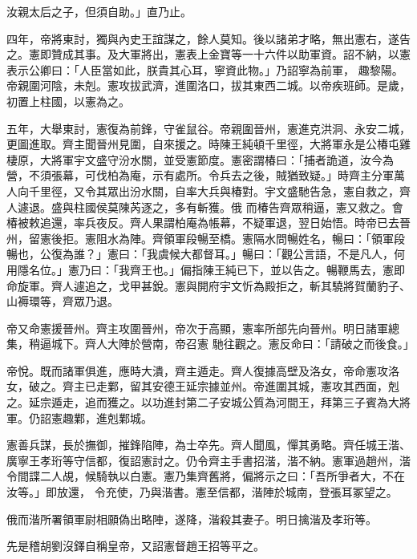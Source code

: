 \begin{pinyinscope}
 汝親太后之子，但須自助。」直乃止。



 四年，帝將東討，獨與內史王誼謀之，餘人莫知。後以諸弟才略，無出憲右，遂告之。憲即贊成其事。及大軍將出，憲表上金寶等一十六件以助軍資。詔不納，以憲表示公卿曰：「人臣當如此，朕貴其心耳，寧資此物。」乃詔寧為前軍，
 趣黎陽。帝親圍河陰，未剋。憲攻拔武濟，進圍洛口，拔其東西二城。以帝疾班師。是歲，初置上柱國，以憲為之。



 五年，大舉東討，憲復為前鋒，守雀鼠谷。帝親圍晉州，憲進克洪洞、永安二城，更圖進取。齊主聞晉州見圍，自來援之。時陳王純頓千里徑，大將軍永是公椿屯雞棲原，大將軍宇文盛守汾水關，並受憲節度。憲密謂椿曰：「捕者詭道，汝今為營，不須張幕，可伐柏為庵，示有處所。令兵去之後，賊猶致疑。」時齊主分軍萬人向千里徑，又令其眾出汾水關，自率大兵與椿對。宇文盛馳告急，憲自救之，齊人遽退。盛與柱國侯莫陳芮逐之，多有斬獲。俄
 而椿告齊眾稍逼，憲又救之。會椿被敕追還，率兵夜反。齊人果謂柏庵為帳幕，不疑軍退，翌日始悟。時帝已去晉州，留憲後拒。憲阻水為陣。齊領軍段暢至橋。憲隔水問暢姓名，暢曰：「領軍段暢也，公復為誰？」憲曰：「我虞候大都督耳。」暢曰：「觀公言語，不是凡人，何用隱名位。」憲乃曰：「我齊王也。」偏指陳王純已下，並以告之。暢鞭馬去，憲即命旋軍。齊人遽追之，戈甲甚銳。憲與開府宇文忻為殿拒之，斬其驍將賀蘭豹子、山褥環等，齊眾乃退。



 帝又命憲援晉州。齊主攻圍晉州，帝次于高顯，憲率所部先向晉州。明日諸軍總集，稍逼城下。齊人大陣於營南，帝召憲
 馳往觀之。憲反命曰：「請破之而後食。」



 帝悅。既而諸軍俱進，應時大潰，齊主遁走。齊人復據高壁及洛女，帝命憲攻洛女，破之。齊主已走鄴，留其安德王延宗據並州。帝進圍其城，憲攻其西面，剋之。延宗遁走，追而獲之。以功進封第二子安城公質為河間王，拜第三子賓為大將軍。仍詔憲趣鄴，進剋鄴城。



 憲善兵謀，長於撫御，摧鋒陷陣，為士卒先。齊人聞風，憚其勇略。齊任城王湝、廣寧王孝珩等守信都，復詔憲討之。仍令齊主手書招湝，湝不納。憲軍過趙州，湝令間諜二人覘，候騎執以白憲。憲乃集齊舊將，偏將示之曰：「吾所爭者大，不在汝等。」即放還，
 令充使，乃與湝書。憲至信都，湝陣於城南，登張耳冢望之。



 俄而湝所署領軍尉相願偽出略陣，遂降，湝殺其妻子。明日擒湝及孝珩等。



 先是稽胡劉沒鐸自稱皇帝，又詔憲督趙王招等平之。




\end{pinyinscope}

